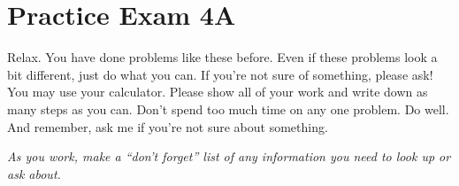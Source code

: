 
\section*{Practice Exam 4A}  

Relax.  You have done problems like these before.  Even if these problems look a bit different, just do what you can.  If you're not sure of something, please ask! You may use your calculator.  Please show all of your work and write down as many steps as you can.  Don't spend too much time on any one problem.  Do well.  And remember, ask me if you're not sure about something. \bigskip

\noindent \emph{As you work, make a ``don't forget'' list of any information you need to look up or ask about.} 

\noindent \hrulefill
\bigskip


